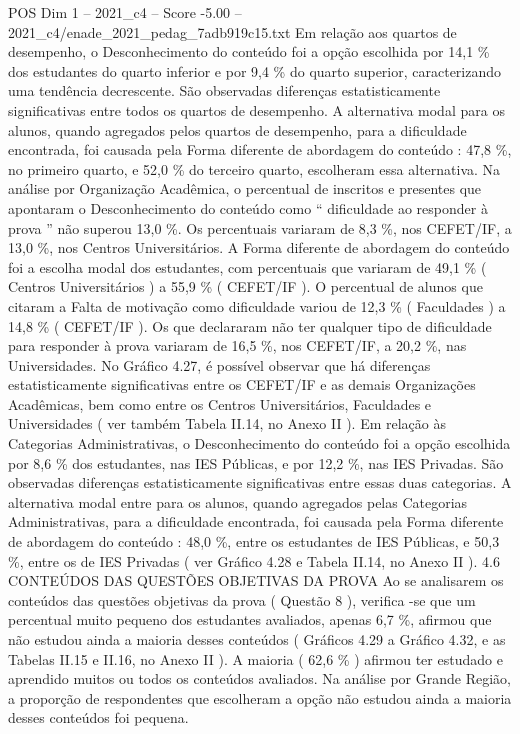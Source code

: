 \begin{textsample}{POS Dim 1 – 2021\_c4 – Score -5.00 – 2021\_c4/enade\_2021\_pedag\_7adb919c15.txt}
Em relação aos quartos de desempenho, o Desconhecimento do conteúdo foi a opção escolhida por 14,1 \% dos estudantes do quarto inferior e por 9,4 \% do quarto superior, caracterizando uma tendência decrescente.
São observadas diferenças estatisticamente significativas entre todos os quartos de desempenho.
A alternativa modal para os alunos, quando agregados pelos quartos de desempenho, para a dificuldade encontrada, foi causada pela Forma diferente de abordagem do conteúdo : 47,8 \%, no primeiro quarto, e 52,0 \% do terceiro quarto, escolheram essa alternativa.
Na análise por Organização Acadêmica, o percentual de inscritos e presentes que apontaram o Desconhecimento do conteúdo como “ dificuldade ao responder à prova ” não superou 13,0 \%.
Os percentuais variaram de 8,3 \%, nos CEFET/IF, a 13,0 \%, nos Centros Universitários.
A Forma diferente de abordagem do conteúdo foi a escolha modal dos estudantes, com percentuais que variaram de 49,1 \% ( Centros Universitários ) a 55,9 \% ( CEFET/IF ).
O percentual de alunos que citaram a Falta de motivação como dificuldade variou de 12,3 \% ( Faculdades ) a 14,8 \% ( CEFET/IF ).
Os que declararam não ter qualquer tipo de dificuldade para responder à prova variaram de 16,5 \%, nos CEFET/IF, a 20,2 \%, nas Universidades.
No Gráfico 4.27, é possível observar que há diferenças estatisticamente significativas entre os CEFET/IF e as demais Organizações Acadêmicas, bem como entre os Centros Universitários, Faculdades e Universidades ( ver também Tabela II.14, no Anexo II ).
Em relação às Categorias Administrativas, o Desconhecimento do conteúdo foi a opção escolhida por 8,6 \% dos estudantes, nas IES Públicas, e por 12,2 \%, nas IES Privadas.
São observadas diferenças estatisticamente significativas entre essas duas categorias.
A alternativa modal entre para os alunos, quando agregados pelas Categorias Administrativas, para a dificuldade encontrada, foi causada pela Forma diferente de abordagem do conteúdo : 48,0 \%, entre os estudantes de IES Públicas, e 50,3 \%, entre os de IES Privadas ( ver Gráfico 4.28 e Tabela II.14, no Anexo II ). 4.6 CONTEÚDOS DAS QUESTÕES OBJETIVAS DA PROVA Ao se analisarem os conteúdos das questões objetivas da prova ( Questão 8 ), verifica -se que um percentual muito pequeno dos estudantes avaliados, apenas 6,7 \%, afirmou que não estudou ainda a maioria desses conteúdos ( Gráficos 4.29 a Gráfico 4.32, e as Tabelas II.15 e II.16, no Anexo II ).
A maioria ( 62,6 \% ) afirmou ter estudado e aprendido muitos ou todos os conteúdos avaliados.
Na análise por Grande Região, a proporção de respondentes que escolheram a opção não estudou ainda a maioria desses conteúdos foi pequena.

\end{textsample}
